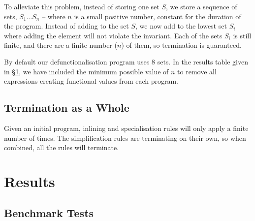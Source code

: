\documentclass[preprint]{sigplanconf}
\begin{document}
To alleviate this problem, instead of storing one set $S$, we store a sequence of sets, $S_1 \ldots S_n$ -- where $n$ is a small positive number, constant for the duration of the program. Instead of adding to the set $S$, we now add to the lowest set $S_i$ where adding the element will not violate the invariant. Each of the sets $S_i$ is still finite, and there are a finite number ($n$) of them, so termination is guaranteed.

By default our defunctionalisation program uses 8 sets. In the results table given in \S\ref{sec:results}, we have included the minimum possible value of $n$ to remove all expressions creating functional values from each program.

\subsection{Termination as a Whole}

Given an initial program, inlining and specialisation rules will only apply a finite number of times. The simplification rules are terminating on their own, so when combined, all the rules will terminate.

\section{Results}
\label{sec:results}

\subsection{Benchmark Tests}
\end{document}

